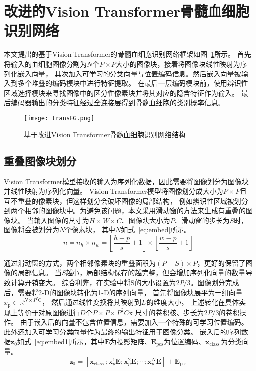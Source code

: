 \section{改进的Vision Transformer骨髓血细胞识别网络}

本文提出的基于Vision Transformer的骨髓血细胞识别网络框架如图~\ref{fig:vit}所示。
首先将输入的血细胞图像分割为$N$个$P \times P$大小的图像块，接着将图像块线性映射为序列化嵌入向量，
其次加入可学习的分类向量与位置编码信息。然后嵌入向量被输入到多个堆叠的编码模块中进行特征提取。
在最后一层编码模块前，使用辨识性区域选择模块来寻找图像中的区分性像素块并将其对应的隐含特征作为输入。
最后编码器输出的分类特征经过全连接层得到骨髓血细胞的类别概率信息。

\begin{figure} 
   \centering   
   \texttt{[image: transFG.png]}   
   \caption{基于改进Vision Transformer骨髓血细胞识别网络结构}   
   \label{fig:vit} 
\end{figure}  

\subsection{重叠图像块划分}
Vision Transformer模型接收的输入为序列化数据，因此需要将图像划分为图像块并线性映射为序列化向量。
Vision Transformer模型将图像划分成大小为$P \times P$且互不重叠的像素块，但这样划分会破坏图像的局部结构，
例如辨识性区域被划分到两个相邻的图像块中。为避免该问题，本文采用滑动窗的方法来生成有重叠的图像块。
当输入图像的尺寸为$H \times W \times C$、图像块大小为$P$、滑动窗的步长为$S$时，图像将会被划分为$N$个像素块，
其中$N$如式~\ref{eq:embed}所示。
\begin{equation}
  n=n_{h} \times n_{w}=\left\lfloor\frac{h-p}{s}+1\right\rfloor \times\left\lfloor\frac{w-p}{s}+1\right\rfloor
  \label{eq:embed}
\end{equation}

通过滑动窗的方式，两个相邻像素块的重叠面积为$(P-S) \times P$，更好的保留了图像的局部信息。
当$S$越小，局部结构保存的越完整，但会增加序列化向量的数量导致计算开销变大。
综合利弊，在实验中将S的大小设置为$2P/3$。图像划分完成后，需要将2-D的图像块转化为1-D的序列向量，
首先将图像块展平为一组向量$x_{\mathrm{p}} \in \mathbb{R}^{N \times P^{2} \mathrm{C}}$，
然后通过线性变换将其映射到$D$的维度大小。
上述转化在具体实现上等价于对原图像进行$D$个$P×P×P^2C$x 尺寸的卷积核、步长为$2P/3$的卷积操作。
由于嵌入后的向量不包含位置信息，需要加入一个特殊的可学习位置编码。
此外还加入可学习分类向量作为最终的输出特征用于图像分类。
嵌入后的序列数据$\boldsymbol{z}_{0}$如式~\ref{eq:embed1}所示，其中$\boldsymbol{E}$为投影矩阵、$\boldsymbol{E}_{\mathrm{pos}}$为位置编码、$\boldsymbol{x}_{\text {class }}$为分类向量。
\begin{equation}
    \boldsymbol{z}_{0}=\left[\boldsymbol{x}_{\text {class }} ; \boldsymbol{x}_{p}^{1} \boldsymbol{E} ; \boldsymbol{x}_{p}^{2} \boldsymbol{E} ; \cdots ; \boldsymbol{x}_{p}^{N} \boldsymbol{E}\right]+\boldsymbol{E}_{\mathrm{pos}}
    \label{eq:embed1}
\end{equation}


